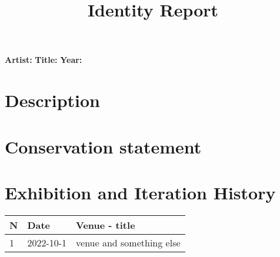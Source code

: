\documentclass[a4paper,12pt]{article}
\begin{document}
\title{Identity Report}
\maketitle
\noindent
\begin{minipage}{0.5\textwidth}
    \large\textbf{Artist:} \newline
    \large\textbf{Title:}  \newline
    \large\textbf{Year:}  \newline
\end{minipage}
\hfill
\begin{minipage}{0.48\textwidth} 
    \centering
\end{minipage}

\section*{Description}


\section*{Conservation statement}


\section*{Exhibition and Iteration History}
\begin{longtable}{|p{}|p{}|p{}|} 
\hline
\textbf{N} & \textbf{Date} & \textbf{Venue - title} \\ 
\hline
\endfirsthead
1 &  2022-10-1 & venue and something else \\\hline

\end{longtable}
\end{document}
